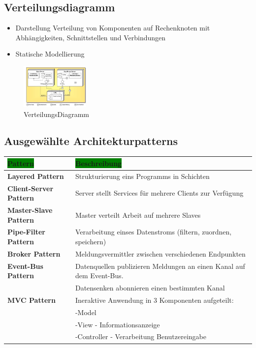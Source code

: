 \documentclass[../ZF_SWEN1.tex]{subfiles}
\begin{document}
\subsection{Verteilungsdiagramm} 

\begin{itemize}
	\item Darstellung Verteilung von Komponenten auf Rechenknoten mit Abhängigkeiten, Schnittstellen und Verbindungen
	\item Statische Modellierung
\end{itemize}

\begin{figure}[H]			\includegraphics[width=0.3\textwidth] {Resources/Images/VerteilungsDiagramm.png}
\caption{\label{fig:VerteilungsDiagramm}VerteilungsDiagramm}
\end{figure}


\subsection{Ausgewählte Architekturpatterns}

\begin{table} [H]

\begin{tabular}{l|l}

\colorbox{green}{\textbf{Pattern}} & \colorbox{green}{\textbf{Beschreibung}}

\\\hline
\textbf{Layered Pattern} & Strukturierung eins Programms in Schichten\\
\hline
\textbf{Client-Server Pattern} & Server stellt Services für mehrere Clients zur Verfügung\\
\hline
\textbf{Master-Slave Pattern} & Master verteilt Arbeit auf mehrere Slaves\\
\hline
\textbf{Pipe-Filter Pattern} & Verarbeitung einses Datenstroms (filtern, zuordnen, speichern)\\
\hline
\textbf{Broker Pattern} & Meldungsvermittler zwischen verschiedenen Endpunkten \\
\hline
\textbf{Event-Bus Pattern} & Datenquellen publizieren Meldungen an einen Kanal auf dem Event-Bus.\\ &Datensenken abonnieren einen bestimmten Kanal\\
\hline
\textbf{MVC Pattern} & Ineraktive Anwendung in 3 Komponenten aufgeteilt:\\
& -Model \\
& -View - Informationsanzeige \\
& -Controller - Verarbeitung Benutzereingabe
\end{tabular}
\end{table}
\end{document}
